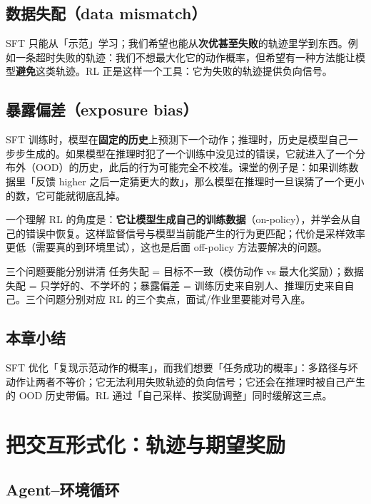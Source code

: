 \documentclass[a4paper]{article}
\begin{document}
\subsection{数据失配（data mismatch）}

SFT 只能从「示范」学习；我们希望也能从\textbf{次优甚至失败}的轨迹里学到东西。例如一条超时失败的轨迹：我们不想最大化它的动作概率，但希望有一种方法能让模型\textbf{避免}这类轨迹。RL 正是这样一个工具：它为失败的轨迹提供负向信号。

\subsection{暴露偏差（exposure bias）}

SFT 训练时，模型在\textbf{固定的历史}上预测下一个动作；推理时，历史是模型自己一步步生成的。如果模型在推理时犯了一个训练中没见过的错误，它就进入了一个分布外（OOD）的历史，此后的行为可能完全不校准。课堂的例子是：如果训练数据里「反馈 higher 之后一定猜更大的数」，那么模型在推理时一旦误猜了一个更小的数，它可能就彻底乱掉。

一个理解 RL 的角度是：\textbf{它让模型生成自己的训练数据}（on-policy），并学会从自己的错误中恢复。这样监督信号与模型当前能产生的行为更匹配；代价是采样效率更低（需要真的到环境里试），这也是后面 off-policy 方法要解决的问题。

\begin{warningbox}{三个问题要能分别讲清}
任务失配 = 目标不一致（模仿动作 vs 最大化奖励）；数据失配 = 只学好的、不学坏的；暴露偏差 = 训练历史来自别人、推理历史来自自己。三个问题分别对应 RL 的三个卖点，面试/作业里要能对号入座。
\end{warningbox}

\subsection{本章小结}
SFT 优化「复现示范动作的概率」，而我们想要「任务成功的概率」：多路径与坏动作让两者不等价；它无法利用失败轨迹的负向信号；它还会在推理时被自己产生的 OOD 历史带偏。RL 通过「自己采样、按奖励调整」同时缓解这三点。

\section{把交互形式化：轨迹与期望奖励}

\subsection{Agent--环境循环}
\end{document}

